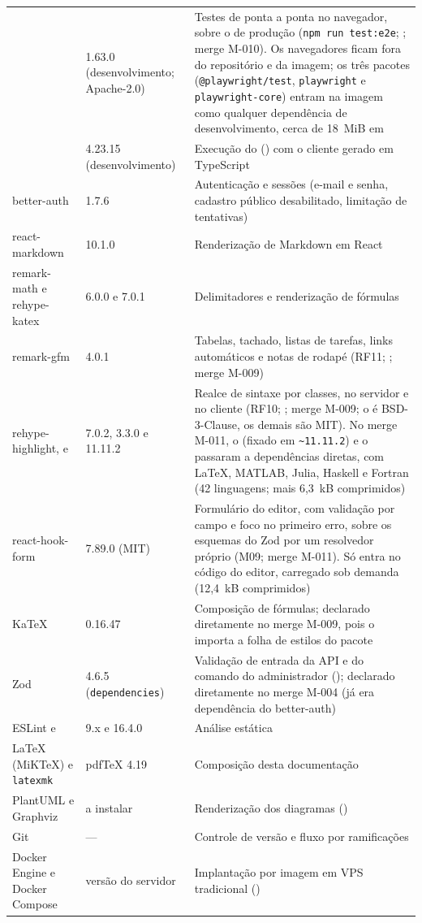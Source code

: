 \begin{table}[htb]
\begin{tabularx}{\linewidth}{@{}L{4.0cm}L{3.0cm}Y@{}}
 & 1.63.0 (desenvolvimento; Apache-2.0) & Testes de ponta a ponta no navegador, sobre o  de produção (\texttt{npm run test:e2e}; ; merge M-010). Os navegadores ficam fora do repositório e da imagem; os três pacotes (\texttt{@playwright/test}, \texttt{playwright} e \texttt{playwright-core}) entram na imagem como qualquer dependência de desenvolvimento, cerca de 18~MiB em \\
 & 4.23.15 (desenvolvimento) & Execução do  () com o cliente gerado em TypeScript\\
better-auth & 1.7.6 & Autenticação e sessões (e-mail e senha, cadastro público desabilitado, limitação de tentativas)\\
react-markdown & 10.1.0 & Renderização de Markdown em React\\
remark-math e rehype-katex & 6.0.0 e 7.0.1 & Delimitadores e renderização de fórmulas\\
remark-gfm & 4.0.1 & Tabelas, tachado, listas de tarefas, links automáticos e notas de rodapé (RF11; ; merge M-009)\\
rehype-highlight,  e  & 7.0.2, 3.3.0 e 11.11.2 & Realce de sintaxe por classes, no servidor e no cliente (RF10; ; merge M-009; o  é BSD-3-Clause, os demais são MIT). No merge M-011, o  (fixado em \texttt{\~{}11.11.2}) e o  passaram a dependências diretas, com LaTeX, MATLAB, Julia, Haskell e Fortran (42 linguagens; mais 6,3~kB comprimidos)\\
react-hook-form & 7.89.0 (MIT) & Formulário do editor, com validação por campo e foco no primeiro erro, sobre os esquemas do Zod por um resolvedor próprio (M09; merge M-011). Só entra no código do editor, carregado sob demanda (12,4~kB comprimidos)\\
KaTeX & 0.16.47 & Composição de fórmulas; declarado diretamente no merge M-009, pois o  importa a folha de estilos do pacote\\
Zod & 4.6.5 (\texttt{dependencies}) & Validação de entrada da API e do comando do administrador (); declarado diretamente no merge M-004 (já era dependência do better-auth)\\
ESLint e  & 9.x e 16.4.0 & Análise estática\\
\LaTeX{} (MiKTeX) e \texttt{latexmk} & pdfTeX 4.19 & Composição desta documentação\\
PlantUML e Graphviz & a instalar & Renderização dos diagramas ()\\
Git & --- & Controle de versão e fluxo por ramificações\\
Docker Engine e Docker Compose & versão do servidor & Implantação por imagem em VPS tradicional ()\\
\bottomrule
\end{tabularx}
\end{table}

